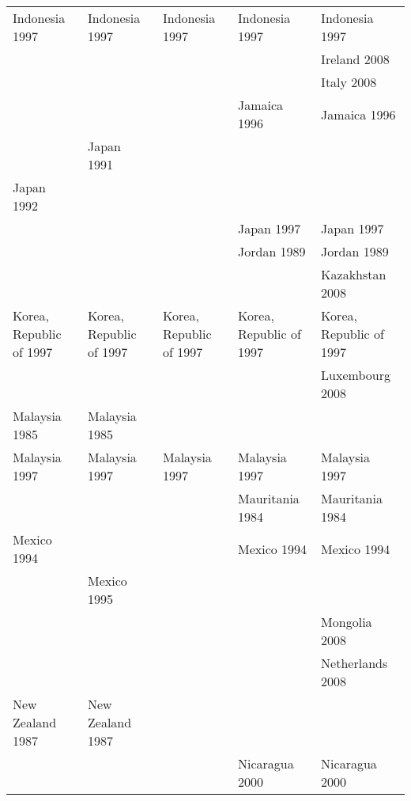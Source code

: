 \begin{table}[ht]
{\begin{tabular}{lllll}
  Indonesia 1997\cellcolor[gray]{0.916666666666667} & Indonesia 1997\cellcolor[gray]{0.916666666666667} & Indonesia 1997\cellcolor[gray]{0.916666666666667} & Indonesia 1997\cellcolor[gray]{0.916666666666667} & Indonesia 1997\cellcolor[gray]{0.916666666666667} \\ 
   &  &  &  & Ireland 2008\cellcolor[gray]{0.5} \\ 
   &  &  &  & Italy 2008\cellcolor[gray]{0.5} \\ 
   &  &  & Jamaica 1996\cellcolor[gray]{0.5} & Jamaica 1996\cellcolor[gray]{0.5} \\ 
   & Japan 1991\cellcolor[gray]{0.5} &  &  &  \\ 
  Japan 1992\cellcolor[gray]{0.5} &  &  &  &  \\ 
   &  &  & Japan 1997\cellcolor[gray]{0.5} & Japan 1997\cellcolor[gray]{0.5} \\ 
   &  &  & Jordan 1989\cellcolor[gray]{1} & Jordan 1989\cellcolor[gray]{1} \\ 
   &  &  &  & Kazakhstan 2008\cellcolor[gray]{1} \\ 
  Korea, Republic of 1997\cellcolor[gray]{0.5} & Korea, Republic of 1997\cellcolor[gray]{0.5} & Korea, Republic of 1997\cellcolor[gray]{0.5} & Korea, Republic of 1997\cellcolor[gray]{0.5} & Korea, Republic of 1997\cellcolor[gray]{0.5} \\ 
   &  &  &  & Luxembourg 2008\cellcolor[gray]{0.5} \\ 
  Malaysia 1985\cellcolor[gray]{0.5} & Malaysia 1985\cellcolor[gray]{0.5} &  &  &  \\ 
  Malaysia 1997\cellcolor[gray]{0.5} & Malaysia 1997\cellcolor[gray]{0.5} & Malaysia 1997\cellcolor[gray]{0.5} & Malaysia 1997\cellcolor[gray]{0.5} & Malaysia 1997\cellcolor[gray]{0.5} \\ 
   &  &  & Mauritania 1984\cellcolor[gray]{1} & Mauritania 1984\cellcolor[gray]{1} \\ 
  Mexico 1994\cellcolor[gray]{0.5} &  &  & Mexico 1994\cellcolor[gray]{0.5} & Mexico 1994\cellcolor[gray]{0.5} \\ 
   & Mexico 1995\cellcolor[gray]{0.5} &  &  &  \\ 
   &  &  &  & Mongolia 2008\cellcolor[gray]{0.5} \\ 
   &  &  &  & Netherlands 2008\cellcolor[gray]{0.5} \\ 
  New Zealand 1987\cellcolor[gray]{0.5} & New Zealand 1987\cellcolor[gray]{0.5} &  &  &  \\ 
   &  &  & Nicaragua 2000\cellcolor[gray]{0.5} & Nicaragua 2000\cellcolor[gray]{0.5} \\ 

\end{tabular}}
\end{table}
